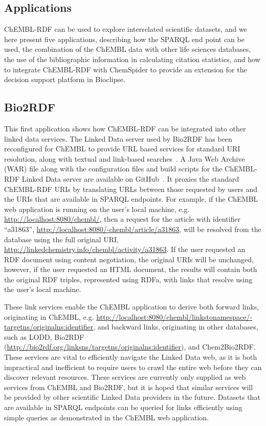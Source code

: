 \documentclass[10pt]{bmc_article}
\newenvironment{bmcformat}{\begin{raggedright}\baselineskip20pt\sloppy\setboolean{publ}{false}}{\end{raggedright}\baselineskip20pt\sloppy}
\begin{document}
\begin{bmcformat}
\section*{Applications}

ChEMBL-RDF can be used to explore interrelated scientific datasets, and we here present five applications,
describing how the SPARQL end point can be used, the combination of the ChEMBL data
with other life sciences databases, the use of the bibliographic information in calculating citation
statistics, and how to integrate ChEMBL-RDF with ChemSpider to provide an extension for the decision
support platform in Bioclipse.

\subsection*{Bio2RDF}

This first application shows how ChEMBL-RDF can be integrated into other linked data services.
The Linked Data server used by Bio2RDF has been reconfigured for ChEMBL to provide URL
based services for standard URI resolution, along with textual and link-based searches~\cite{Ansell2011}. 
A Java Web Archive (WAR) file along with the configuration files and build scripts for the ChEMBL-RDF Linked Data server are available on GitHub~\cite{WebAppGitHub}. 
It proxies the standard ChEMBL-RDF URIs by translating URLs between those requested by users and the URIs that are available
in SPARQL endpoints. For example, if the ChEMBL web application is running on the user's
local machine, e.g. \url{http://localhost:8080/chembl/}, then a request for the
article with identifier ``a31863'', \url{http://localhost:8080/-chembl/article/a31863},
will be resolved from the database using the full original URI,
\url{http://linkedchemistry.info/chembl/activity/a31863}. If the
user requested an RDF document using content negotiation, the original URIs will be unchanged,
however, if the user requested an HTML document, the results will contain both the
original RDF triples, represented using RDFa, with links that resolve using the user's local machine.

These link services enable the ChEMBL application to derive both forward links, originating in
ChEMBL, e.g. \url{http://localhost:8080/chembl/linkstonamespace/-targetns/originalns:identifier},
and backward links, originating in other databases, such as LODD, Bio2RDF
(\url{http://bio2rdf.org/linksns/targetns/originalns:identifier}), and Chem2Bio2RDF.
These services are vital to efficiently navigate the Linked Data web, as it is both
impractical and inefficient to require users to crawl the entire web before they can discover 
relevant resources. These services are currently only supplied as web services from ChEMBL and
Bio2RDF, but it is hoped that similar services will be provided by other scientific Linked Data
providers in the future. Datasets that are available in SPARQL endpoints can be queried for
links efficiently using simple queries as demonstrated in the ChEMBL web application.


\end{bmcformat}
\end{document}
